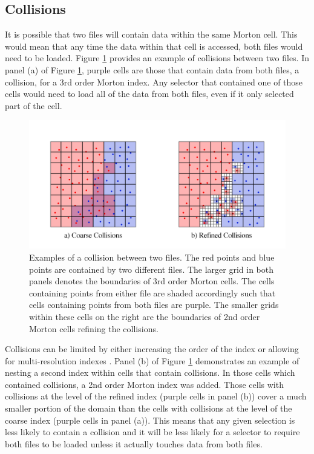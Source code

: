 \documentclass[apjl]{emulateapj}
\begin{document}
\subsection{Collisions}
It is possible that two files will contain data within the same Morton cell. This would mean that any time the data within that cell is accessed, both files would need to be loaded. Figure \ref{fig:collision} provides an example of collisions between two files. In panel (a) of Figure \ref{fig:collision}, purple cells are those that contain data from both files, a collision, for a 3rd order Morton index. Any selector that contained one of those cells would need to load all of the data from both files, even if it only selected part of the cell.
%
\begin{figure}[htbp]
\begin{center}
\includegraphics[width=\columnwidth,keepaspectratio]{../images/collisions.png}
\caption{Examples of a collision between two files. The red points and blue points are contained by two different files. The larger grid in both panels denotes the boundaries of 3rd order Morton cells.  The cells containing points from either file are shaded accordingly such that cells containing points from both files are purple. The smaller grids within these cells on the right are the boundaries of 2nd order Morton cells refining the collisions.}
\label{fig:collision}
\end{center}
\end{figure}
%

Collisions can be limited by either increasing the order of the index or allowing for multi-resolution indexes \citep{Sinha2006,Sinha2007}. Panel (b) of Figure \ref{fig:collision} demonstrates an example of nesting a second index within cells that contain collisions. In those cells which contained collisions, a 2nd order Morton index was added. Those cells with collisions at the level of the refined index (purple cells in panel (b)) cover a much smaller portion of the domain than the cells with collisions at the level of the coarse index (purple cells in panel (a)). This means that any given selection is less likely to contain a collision and it will be less likely for a selector to require both files to be loaded unless it actually touches data from both files.
\end{document}
